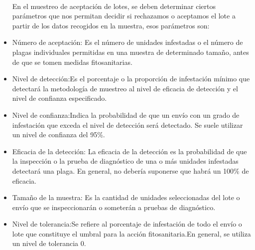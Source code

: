 \begin{itemize}
~\\En el muestreo de aceptaci\'{o}n de lotes, se deben determinar ciertos par\'{a}metros que nos permitan decidir si rechazamos o aceptamos el lote a partir de los datos recogidos en la muestra, esos par\'{a}metros son:
\item N\'{u}mero de aceptaci\'{o}n: Es el n\'{u}mero de unidades infestadas o el n\'{u}mero de plagas individuales permitidas en una
muestra de determinado tama\~{n}o, antes de que se tomen medidas fitosanitarias.\cite{MUES}
\item Nivel de detecci\'{o}n:Es el porcentaje o la proporci\'{o}n de infestaci\'{o}n m\'{i}nimo que detectar\'{a} la metodolog\'{i}a de muestreo
al nivel de eficacia de detecci\'{o}n y el nivel de confianza especificado.\cite{MUES}
\item Nivel de confianza:Indica la probabilidad de que un env\'{i}o con un grado de infestaci\'{o}n que exceda el nivel de
detecci\'{o}n ser\'{a} detectado. Se suele utilizar un nivel de confianza del 95\%.\cite{MUES}
\item Eficacia de la detecci\'{o}n: La eficacia de la detecci\'{o}n es la probabilidad de que la inspecci\'{o}n o la prueba de diagn\'{o}stico de una o m\'{a}s unidades infestadas detectar\'{a} una plaga. En general, no deber\'{i}a suponerse que habr\'{a} un 100\% de eficacia.\cite{MUES}
\item Tama\~{n}o de la muestra: Es la cantidad de unidades seleccionadas del lote o env\'{i}o que se inspeccionar\'{a}n o someter\'{a}n a
pruebas de diagn\'{o}stico.\cite{MUES}
\item Nivel de tolerancia:Se refiere al porcentaje de infestaci\'{o}n de todo el env\'{i}o o lote que constituye el umbral para la acci\'{o}n fitosanitaria.En general, se utiliza un nivel de tolerancia 0.\cite{MUES}
\end{itemize}
